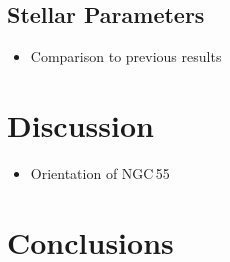 \subsection{Stellar Parameters} %
\label{sub:stellar_parameters}
\begin{itemize}
        \item Comparison to previous results
    \end{itemize}



\section{Discussion} %
\label{sec:discussion}

\begin{itemize}
    \item Orientation of NGC\,55
\end{itemize}

\section{Conclusions} %
\label{sec:conclusions}


